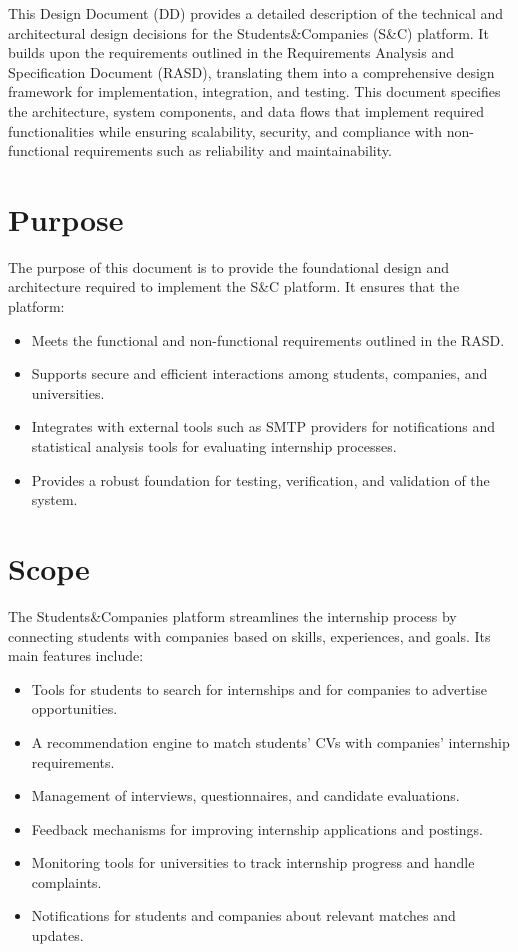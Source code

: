 This Design Document (DD) provides a detailed description of the technical and architectural design decisions for the Students\&Companies (S\&C) platform.
It builds upon the requirements outlined in the Requirements Analysis and Specification Document (RASD),
translating them into a comprehensive design framework for implementation, integration, and testing.
This document specifies the architecture, system components, and data flows that implement required functionalities while ensuring scalability, security, and compliance with non-functional requirements such as reliability and maintainability.

\section{Purpose}\label{sec:purpose}
The purpose of this document is to provide the foundational design and architecture required to implement the S\&C platform. It ensures that the platform:
\begin{itemize}
    \item Meets the functional and non-functional requirements outlined in the RASD.
    \item Supports secure and efficient interactions among students, companies, and universities.
    \item Integrates with external tools such as SMTP providers for notifications and statistical analysis tools for evaluating internship processes.
    \item Provides a robust foundation for testing, verification, and validation of the system.
\end{itemize}

\section{Scope}\label{sec:scope}
The Students\&Companies platform streamlines the internship process by connecting students with companies based on skills, experiences, and goals.
Its main features include:
\begin{itemize}
    \item Tools for students to search for internships and for companies to advertise opportunities.
    \item A recommendation engine to match students’ CVs with companies’ internship requirements.
    \item Management of interviews, questionnaires, and candidate evaluations.
    \item Feedback mechanisms for improving internship applications and postings.
    \item Monitoring tools for universities to track internship progress and handle complaints.
    \item Notifications for students and companies about relevant matches and updates.
\end{itemize}

